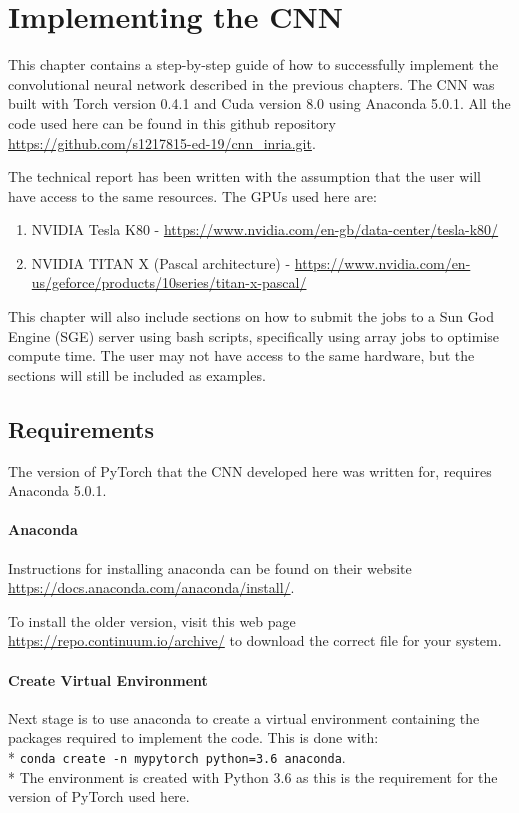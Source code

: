 \chapter{Implementing the CNN}
This chapter contains a step-by-step guide of how to successfully implement the convolutional neural network described in the previous chapters. The CNN was built with Torch version 0.4.1 and Cuda version 8.0 using Anaconda 5.0.1. All the code used here can be found in this github repository \url{https://github.com/s1217815-ed-19/cnn_inria.git}. 
\par
The technical report has been written with the assumption that the user will have access to the same resources. The GPUs used here are:
\begin{enumerate}
    \item NVIDIA Tesla K80 - \url{https://www.nvidia.com/en-gb/data-center/tesla-k80/}
    \item NVIDIA TITAN X (Pascal architecture) - \url{https://www.nvidia.com/en-us/geforce/products/10series/titan-x-pascal/}
\end{enumerate}
\par
This chapter will also include sections on how to submit the jobs to a Sun God Engine (SGE) server using bash scripts, specifically using array jobs to optimise compute time. The user may not have access to the same hardware, but the sections will still be included as examples.
\section{Requirements}
The version of PyTorch that the CNN developed here was written for, requires Anaconda 5.0.1.
\subsubsection{Anaconda}
Instructions for installing anaconda can be found on their website \url{https://docs.anaconda.com/anaconda/install/}.
\par
To install the older version, visit this web page \url{https://repo.continuum.io/archive/} to download the correct file for your system.
\subsubsection{Create Virtual Environment}
Next stage is to use anaconda to create a virtual environment containing the packages required to implement the code. This is done with:\medskip \\* \texttt{conda create -n mypytorch python=3.6 anaconda}. \medskip \\* 
The environment is created with Python 3.6 as this is the requirement for the version of PyTorch used here.


